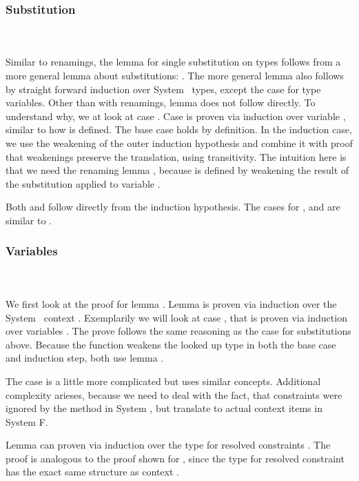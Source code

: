 \subsubsection{Substitution}\hfill\\\\
Similar to renamings, the lemma for single substitution on types  follows from a more general lemma about substitutions: \DPTTypePresSingleSub. 
The more general lemma  also follows by straight forward induction over System \Fo\ types, except the case for type variables. 
Other than with renamings, lemma  does not follow directly. 
To understand why, we at look at case .
\DPTVarPresSub
Case  is proven via induction over variable , similar to how  is defined. 
The base case holds by definition. 
In the induction case, we use the weakening of the outer induction hypothesis and combine it with proof that weakenings preserve the translation, using transitivity. 
The intuition here is that we need the renaming lemma , because  is defined by weakening the result of the substitution  applied to variable .

\noindent Both  and  follow directly from the induction hypothesis. 
The cases for ,  and  are similar to .

\subsubsection{Variables}\hfill\\\\
We first look at the proof for lemma . 
Lemma  is proven via induction over the System \Fo\ context . 
\DPTVarPresLookup
Exemplarily we will look at case   , that is proven via induction over variables . 
The prove follows the same reasoning as the  case for substitutions above. 
Because the function  weakens the looked up type  in both the base case and induction step, both use lemma . 

\noindent The case    is a little more complicated but uses similar concepts.  Additional complexity arieses, because we need to deal with the fact, that constraints were ignored by the  method in System \Fo, but translate to actual context items in System F.

\noindent Lemma  can proven via induction over the type for resolved constraints \Data{[}  \Data{]∈} . 
The proof is analogous to the proof shown for , since the type for resolved constraint has the exact same structure as context . 
